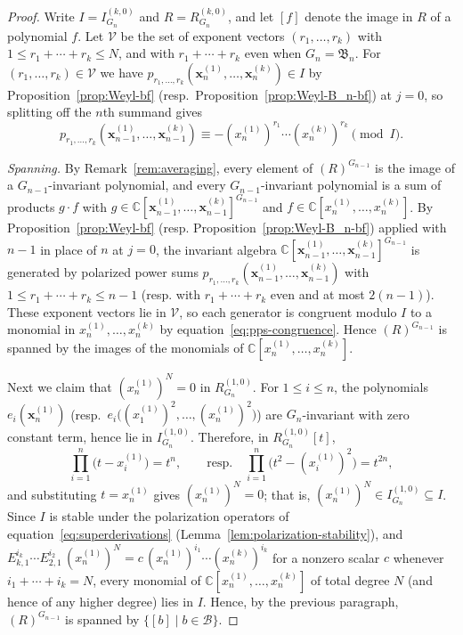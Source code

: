 \documentclass[12pt]{amsart}
\theoremstyle{plain}
\theoremstyle{definition}
\newcommand{\C}{\mathbb{C}}
\begin{document}
\begin{proof}
    Write $I = I_{G_n}^{(k,0)}$ and $R = R_{G_n}^{(k,0)}$, and let
    $[f]$ denote the image in $R$ of a polynomial $f$. 
    Let $\mathcal{V}$ be the set of exponent vectors $(r_1,\ldots,r_k)$ with $1 \leq r_1 + \cdots + r_k \leq N$, and with $r_1 + \cdots + r_k$ even when $G_n = \mathfrak{B}_n$. For $(r_1,\ldots,r_k) \in \mathcal{V}$ we have $p_{r_1,\ldots,r_k}(\bm{x}^{(1)}_n, \ldots, \bm{x}^{(k)}_n) \in I$ by Proposition~\ref{prop:Weyl-bf} (resp.\ Proposition~\ref{prop:Weyl-B_n-bf}) at $j = 0$, so splitting off the $n$th summand gives
    \begin{equation}\label{eq:pps-congruence}
        p_{r_1,\ldots,r_k}(\bm{x}^{(1)}_{n-1}, \ldots, \bm{x}^{(k)}_{n-1})
        \equiv -(x^{(1)}_n)^{r_1} \cdots (x^{(k)}_n)^{r_k} \pmod{I}.
    \end{equation}

    \emph{Spanning.} By Remark~\ref{rem:averaging}, every element of $(R)^{G_{n-1}}$ is the image of a $G_{n-1}$-invariant polynomial, and every $G_{n-1}$-invariant polynomial is a sum of products $g \cdot f$ with $g \in \C[\bm{x}^{(1)}_{n-1}, \ldots, \bm{x}^{(k)}_{n-1}]^{G_{n-1}}$ and $f \in \C[x^{(1)}_n, \ldots, x^{(k)}_n]$. 
    By Proposition~\ref{prop:Weyl-bf} (resp. Proposition~\ref{prop:Weyl-B_n-bf}) applied with $n-1$ in place of $n$ at $j = 0$, the invariant algebra $\C[\bm{x}^{(1)}_{n-1}, \ldots, \bm{x}^{(k)}_{n-1}]^{G_{n-1}}$ is generated by polarized power sums $p_{r_1,\ldots,r_k}(\bm{x}_{n-1}^{(1)},\ldots,\bm{x}_{n-1}^{(k)})$ with $1 \leq r_1+\cdots +r_k \leq n-1$ (resp. with $r_1+\cdots+r_k$ even and at most $2(n-1)$).
    These exponent vectors lie in $\mathcal{V}$, so each generator is congruent modulo $I$ to a monomial in $x^{(1)}_n, \ldots, x^{(k)}_n$ by equation~\eqref{eq:pps-congruence}.
    Hence $(R)^{G_{n-1}}$ is spanned by the images of the monomials of $\C[x^{(1)}_n, \ldots, x^{(k)}_n]$.

    Next we claim that $(x^{(1)}_n)^{N} = 0$ in $R_{G_n}^{(1,0)}$. 
    For $1 \leq i \leq n$, the polynomials $e_i(\bm{x}^{(1)}_n)$ (resp.\ $e_i\big((x^{(1)}_1)^2, \ldots, (x^{(1)}_n)^2\big)$) are $G_n$-invariant with zero constant term, hence lie in $I_{G_n}^{(1,0)}$. 
    Therefore, in $R_{G_n}^{(1,0)}[t]$,
    \begin{equation}
        \prod_{i=1}^{n}\big(t - x^{(1)}_i\big) = t^{n}, \qquad
        \text{resp.}\quad
        \prod_{i=1}^{n}\big(t^2 - (x^{(1)}_i)^2\big) = t^{2n},
    \end{equation}
    and substituting $t = x^{(1)}_n$ gives $(x^{(1)}_n)^{N} = 0$; that is, $(x^{(1)}_n)^{N} \in I_{G_n}^{(1,0)} \subseteq I$. 
    Since $I$ is stable under the polarization operators of equation~\eqref{eq:superderivations} (Lemma~\ref{lem:polarization-stability}), and $E_{k,1}^{i_k} \cdots E_{2,1}^{i_2}\,(x^{(1)}_n)^{N} = c\, (x^{(1)}_n)^{i_1}\cdots(x^{(k)}_n)^{i_k}$ for a nonzero scalar $c$ whenever $i_1 + \cdots + i_k = N$, every monomial of $\C[x^{(1)}_n, \ldots, x^{(k)}_n]$ of total degree $N$ (and hence of any higher degree) lies in $I$. 
    Hence, by the previous paragraph, $(R)^{G_{n-1}}$ is spanned by $\{[b] \mid b \in \mathcal{B}\}$.


\end{proof}
\end{document}
